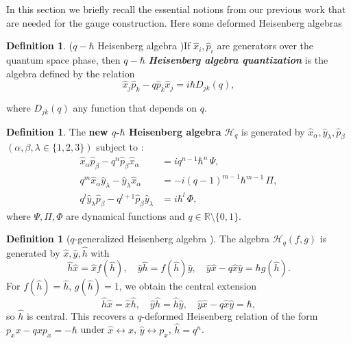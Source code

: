 \documentclass[12pt,a4paper]{article}
\theoremstyle{plain}
\theoremstyle{definition}
\newtheorem{definition}[theorem]{Definition}
\begin{document}
In this section we briefly recall the essential notions from our previous work \cite{Jaramillo2026a} that are needed for the gauge construction. Here some deformed Heisenberg algebras

\begin{definition}($q-\hbar$ Heisenberg algebra \cite{Volovich-Arefeva-91})\label{Arefeva-Volovich1991definition}
     If $\hat{x}_{i},\hat{p}_{i}$ are generators over the quantum space phase, then $q-\hbar$ \textit{\textbf{Heisenberg algebra quantization}} is the algebra defined by the relation 
\begin{equation}\label{quantization}
     \hat{x}_{j}\hat{p}_{k}-q\hat{p}_{k}\hat{x}_{j}=i\hbar D_{jk}(q),
\end{equation}
     
where $D_{jk}(q)$ any function that depends on $q$.
\end{definition}
     
\begin{definition}
The \textbf{new $q$-$\hbar$ Heisenberg algebra} $\boldsymbol{\mathcal{H}}_{q}$ is generated by $\hat{x}_{\alpha}, \hat{y}_{\lambda}, \hat{p}_{\beta}$ $(\alpha,\beta,\lambda\in\{1,2,3\})$ subject to \cite{Jaramillo2025}:
\begin{align}
   \label{eq:new1} \hat{x}_{\alpha}\hat{p}_{\beta} - q^{n}\hat{p}_{\beta}\hat{x}_{\alpha} &= i q^{n-1}\hbar^{n}\, \Psi, \\
   \label{eq:new2} q^{m}\hat{x}_{\alpha}\hat{y}_{\lambda} - \hat{y}_{\lambda}\hat{x}_{\alpha} &= -i (q-1)^{m-1}\hbar^{m-1}\, \Pi, \\
    \label{eq:new3} q^{l}\hat{y}_{\lambda}\hat{p}_{\beta} - q^{l+1}\hat{p}_{\beta}\hat{y}_{\lambda} &= i \hbar^{l}\, \Phi,
\end{align}
where $\Psi,\Pi,\Phi$ are dynamical functions and $q\in\mathbb{R}\setminus\{0,1\}$. 
\end{definition}

\begin{definition}[$q$-generalized Heisenberg algebra \cite{Razavinia-Lopes2022}]
The algebra $\mathcal{H}_{q}(f,g)$ is generated by $\hat{x},\hat{y},\hat{h}$ with
\begin{equation}\label{eq:gen-Heis}
\hat{h}\hat{x}=\hat{x}f(\hat{h}),\quad \hat{y}\hat{h}=f(\hat{h})\hat{y},\quad \hat{y}\hat{x}-q\hat{x}\hat{y}=\hbar g(\hat{h}).
\end{equation}
For $f(\hat{h})=\hat{h}$, $g(\hat{h})=1$, we obtain the central extension
\[
\hat{h}\hat{x}=\hat{x}\hat{h},\quad \hat{y}\hat{h}=\hat{h}\hat{y},\quad \hat{y}\hat{x}-q\hat{x}\hat{y}=\hbar,
\]
so $\hat{h}$ is central. This recovers a $q$-deformed Heisenberg relation of the form $p_x x - q x p_x = -\hbar$ under $\hat{x}\leftrightarrow x$, $\hat{y}\leftrightarrow p_x$, $\hat{h}=q^n$.
\end{definition}
\end{document}

